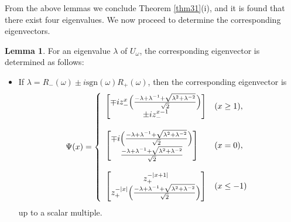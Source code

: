 \documentclass[a4paper,12pt]{article}
\theoremstyle{plain}
\theoremstyle{definition}
\newtheorem{lemma}[thm]{Lemma}
\theoremstyle{definition}
\begin{document}
From the above lemmas we conclude Theorem \ref{thm31}(i), and it is found that there exist four eigenvalues.  We now proceed to determine the corresponding eigenvectors.



\begin{lemma}\label{lemma48}
For an eigenvalue $\lambda$ of $U_{\omega}$, the corresponding eigenvector is determined as follows:

\begin{itemize}
\item[(i)]If $\lambda = R_-(\omega) \pm i \mathrm{sgn}(\omega)R_+(\omega)$, then the corresponding eigenvector is
\begin{eqnarray}
\Psi(x)=
\left\{\begin{array}{ll}
\begin{bmatrix}
\mp i z_{-}^{x}\Bigl(\frac{-\lambda +\lambda^{-1}+\sqrt{\lambda^2+\lambda^{-2}}}{\sqrt{2}} \Bigr) \\
\pm i z_{-}^{x-1}
\end{bmatrix} & (x\geq 1 ), \\\\
\begin{bmatrix}
    \mp i\Bigl(\frac{-\lambda +\lambda^{-1}+\sqrt{\lambda^2+\lambda^{-2}}}{\sqrt{2}} \Bigr) \\
    \frac{-\lambda +\lambda^{-1}+\sqrt{\lambda^2+\lambda^{-2}}}{\sqrt{2}}
\end{bmatrix} & (x=0), \\\\
\begin{bmatrix}
z_{+}^{-|x+1|} \\
z_{+}^{-|x|}\Bigl(\frac{-\lambda +\lambda^{-1}+\sqrt{\lambda^2+\lambda^{-2}}}{\sqrt{2}} \Bigr)
\end{bmatrix} & (x\leq -1)
\end{array}\right. \nonumber
\end{eqnarray}
up to a scalar multiple.


\end{itemize}
\end{lemma}
\end{document}

